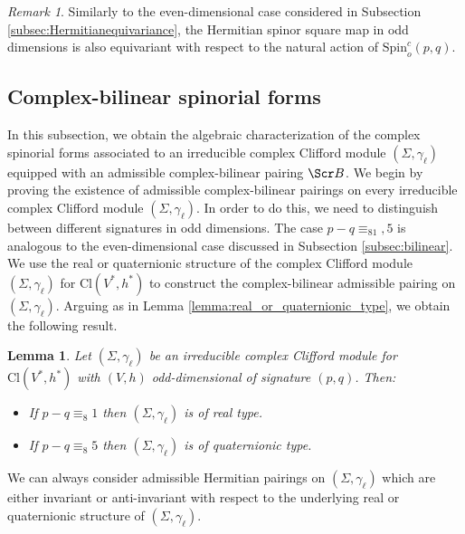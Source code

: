 \documentclass[10pt,a4paper,twoside,reqno]{amsart}
\theoremstyle{plain}
\newtheorem{lemma}[thm]{Lemma}
\theoremstyle{definition}
\theoremstyle{remark}
\newtheorem{remark}[thm]{Remark}
\def\scB{\Scr B}
\def\Cl{\mathrm{Cl}}
\def\Spin{\mathrm{Spin}}
\def\Spin{\mathrm{Spin}}
\begin{document}
\begin{remark}
Similarly to the even-dimensional case considered in Subsection \ref{subsec:Hermitianequivariance}, the Hermitian spinor square map in odd dimensions is also equivariant with respect to the natural action of $\Spin^c_o (p,q)$.
\end{remark}


\subsection{Complex-bilinear spinorial forms}


In this subsection, we obtain the algebraic characterization of the complex spinorial forms associated to an irreducible complex Clifford module $(\Sigma,\gamma_\ell)$ equipped with an admissible complex-bilinear pairing $\scB$. We begin by proving the existence of admissible complex-bilinear pairings on every irreducible complex Clifford module $(\Sigma,\gamma_\ell)$. In order to do this, we need to distinguish between different signatures in odd dimensions. The case $p-q\equiv_81,5$ is analogous to the even-dimensional case discussed in Subsection \ref{subsec:bilinear}. We use the real or quaternionic structure of the complex Clifford module $(\Sigma,\gamma_\ell)$ for $\Cl(V^*,h^*)$ to construct the complex-bilinear admissible pairing on $(\Sigma,\gamma_\ell)$. Arguing as in Lemma \ref{lemma:real_or_quaternionic_type}, we obtain the following result.

\begin{lemma}\label{lemma:R_orQ_p-q=1,5}
Let $(\Sigma,\gamma_\ell)$ be an irreducible complex Clifford module for $\Cl(V^*,h^*)$ with $(V,h)$ odd-dimensional of signature $(p,q)$. Then:
\begin{itemize}
    \item If $p-q\equiv_8 1$ then $(\Sigma,\gamma_\ell)$ is of real type.
    \item If $p-q\equiv_8 5$ then $(\Sigma,\gamma_\ell)$ is of quaternionic type.
\end{itemize}
\end{lemma}

\noindent
We can always consider admissible Hermitian pairings on $(\Sigma,\gamma_\ell)$ which are either invariant or anti-invariant with respect to the underlying real or quaternionic structure of $(\Sigma,\gamma_\ell)$.
\end{document}
